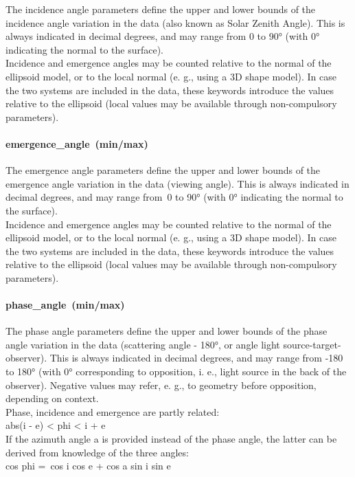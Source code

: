 \documentclass[11pt,a4paper]{ivoa}
\begin{document}
The incidence angle parameters define the upper and lower bounds of the incidence angle variation in the data (also known as Solar Zenith Angle). This is always indicated in decimal degrees, and may range from 0 to 90° (with 0° indicating the normal to the surface).\\ Incidence and emergence angles may be counted relative to the normal of the ellipsoid model, or to the local normal (e. g., using a 3D shape model). In case the two systems are included in the data, these keywords introduce the values relative to the ellipsoid (local values may be available through non-compulsory parameters).

\paragraph{emergence\_angle (min/max)}

The emergence angle parameters define the upper and lower bounds of the emergence angle variation in the data (viewing angle). This is always indicated in decimal degrees, and may range from 0 to 90° (with 0° indicating the normal to the surface).\\ Incidence and emergence angles may be counted relative to the normal of the ellipsoid model, or to the local normal (e. g., using a 3D shape model). In case the two systems are included in the data, these keywords introduce the values relative to the ellipsoid (local values may be available through non-compulsory parameters).

\paragraph{phase\_angle (min/max)}

The phase angle parameters define the upper and lower bounds of the phase angle variation in the data (scattering angle - 180°, or angle light source-target-observer). This is always indicated in decimal degrees, and may range from -180 to 180° (with 0° corresponding to opposition, i. e., light source in the back of the observer). Negative values may refer, e. g., to geometry before opposition, depending on context.\\ Phase, incidence and emergence are partly related:\\ abs(i - e) < phi < i + e\\ If the azimuth angle a is provided instead of the phase angle, the latter can be derived from knowledge of the three angles:\\ cos phi = cos i cos e + cos a sin i sin e
\end{document}
